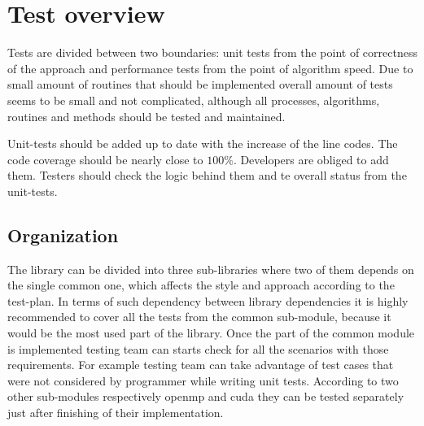 \section{Test overview} \label{s:introduction:test-overview}
	\begin{comment}
		$<$Describe the test organization, test schedule, integrity level scheme, test resources, responsibilities, tools, techniques, and methods necessary to perform the testing. $>$
	\end{comment}
	
	Tests are divided between two boundaries: unit tests from the point of correctness of the approach and performance tests from the point of algorithm speed. Due to small amount of routines that should be implemented overall amount of tests seems to be small and not complicated, although all processes, algorithms, routines and methods should be tested and maintained.
	
	Unit-tests should be added up to date with the increase of the line codes. The code coverage should be nearly close to $100\%$. Developers are obliged to add them. Testers should check the logic behind them and te overall status from the unit-tests.
\subsection{Organization} \label{s:introduction:organization}
	\begin{comment}
		$<$Describe the relationship of the test processes to other processes such as development, project
		management, quality assurance, and configuration management. Include the lines of communication
		within the testing organization(s), the authority for resolving issues raised by the testing tasks, and the authority for approving test products and processes. This may include (but should not be limited to) a visual representation, e.g., an organization chart. $>$
	\end{comment}

	The library can be divided into three sub-libraries where two of them depends on the single common one, which affects the style and approach according to the test-plan. In terms of such dependency between library dependencies it is highly recommended to cover all the tests from the common sub-module, because it would be the most used part of the library. Once the part of the common module is implemented testing team can starts check for all the scenarios with those requirements. For example testing team can take advantage of test cases that were not considered by programmer while writing unit tests. According to two other sub-modules respectively \gls{openmp} and \gls{cuda} they can be tested separately just after finishing of their implementation.
	
